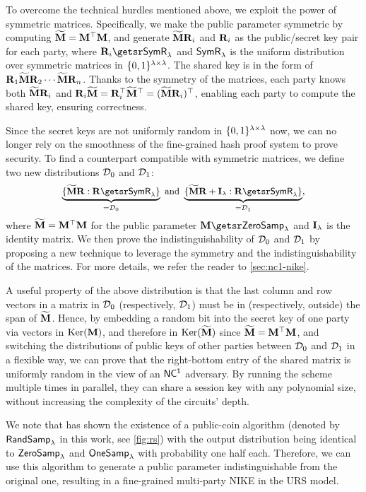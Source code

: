 To overcome the technical hurdles mentioned above, we exploit the power of symmetric matrices.
Specifically, we make the public parameter symmetric by computing $\widetilde{\mathbf{{M}}}=\mathbf{{M}}^\top\mathbf{{M}}$, and generate $\widetilde{\mathbf{{M}}}{\mathbf{{R}}}_i$ and ${\mathbf{{R}}}_i$ as the public/secret key pair for each party, where $\sR_i\getsr\sr$ and ${\mathsf{SymR}}_\lambda$ is the uniform distribution over symmetric matrices in $\{0, 1\}^{\lambda\times\lambda}$. The shared key is in the form of
${\mathbf{{R}}}_1\widetilde{\mathbf{{M}}}{\mathbf{{R}}}_2\cdots \widetilde{\mathbf{{M}}}{\mathbf{{R}}}_n$. Thanks to the symmetry of the matrices, each party knows both $\widetilde{\mathbf{{M}}}{\mathbf{{R}}}_i$ and ${\mathbf{{R}}}_i\widetilde{\mathbf{{M}}}={\mathbf{{R}}}_i^\top\widetilde{\mathbf{{M}}}^\top=(\widetilde{\mathbf{{M}}}{\mathbf{{R}}}_i)^\top$, enabling each party to compute the shared key, ensuring correctness. 

Since the secret keys are not uniformly random in $\{0, 1\}^{\lambda\times\lambda}$ now, we can no longer rely on the smoothness of the fine-grained hash proof system to prove security. To find a counterpart compatible with symmetric matrices, we define two new distributions $\mathcal{D}_0$ and $\mathcal{D}_1$:
\[\small{ \underbrace{\{ \sM\sR : \sR\getsr\sr \}}_{=\ZDist}
\ \mbox{and}\
\underbrace{\{\sM\sR+\matI  : \sR\getsr\sr\}}_{=\ODist}}, \]
where $\widetilde{\mathbf{{M}}}=\mathbf{{M}}^\top\mathbf{{M}}$ for the public parameter $\matr M \getsr \zs$ and ${\mathbf{{I}}}_{\lambda}$ is the identity matrix.
We then prove the indistinguishability of $\mathcal{D}_0$ and $\mathcal{D}_1$ by proposing a new technique to leverage the symmetry and the indistinguishability of the matrices. For more details, we refer the reader to \cref{sec:nc1-nike}.

A useful property of the above distribution is that the last column and row vectors in a matrix in $\mathcal{D}_0$ (respectively, $\mathcal{D}_1$) must be in (respectively, outside) the span of $\widetilde{\mathbf{{M}}}$. Hence, by embedding a random bit into the secret key of one party via vectors in $\operatorname{Ker}(\mathbf{{M}})$, and therefore in $\operatorname{Ker}(\widetilde{\mathbf{{M}}})$ since $\widetilde{\mathbf{{M}}}=\mathbf{{M}}^\top\mathbf{{M}}$, and switching the distributions of public keys of other parties between $\mathcal{D}_0$ and $\mathcal{D}_1$ in a flexible way, we can prove that the right-bottom entry of the shared matrix is uniformly random in the view of an $\mathsf{NC^1}$ adversary. By running the scheme multiple times in parallel, they can share a session key with any polynomial size, without increasing the complexity of the circuits' depth.

We note that \cite{EC:WanPan22} has shown the existence of a public-coin algorithm (denoted by ${\mathsf{RandSamp}}_\lambda$ in this work, see \cref{fig:rs}) with the output distribution being identical to ${\mathsf{ZeroSamp}}_\lambda$ and ${\mathsf{OneSamp}}_\lambda$ with probability one half each. Therefore, we can use this algorithm to generate a public parameter indistinguishable from the original one, resulting in a fine-grained multi-party NIKE in the URS model.
 
